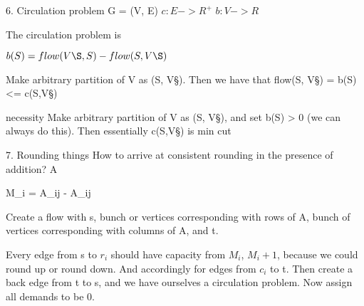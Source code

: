 6. Circulation problem
G = (V, E)
$c: E -> R^+$
$b: V -> R$

The circulation problem is 

$b(S) = flow (V\S, S) - flow(S, V\S)$

Make arbitrary partition of V as (S, V\S).  Then we have that 
flow(S, V\S) = b(S) <= c(S,V\S)

necessity
Make arbitrary partition of V as (S, V\S), and set b(S) > 0 (we can always do this).
Then essentially c(S,V\S) is min cut


7. Rounding things
How to arrive at consistent rounding in the presence of addition?
A

M_i = \floor \sum A_ij - \sum \floor A_ij

Create a flow with s, bunch or vertices corresponding with rows of A, bunch of
vertices corresponding with columns of A, and t.

Every edge from s to $r_i$ should have capacity from $M_i$, $M_i + 1$, because
we could round up or round down.  And accordingly for edges from $c_i$ to t.
Then create a back edge from t to s, and we have ourselves a circulation
problem.  Now assign all demands to be 0.
